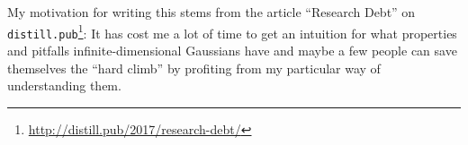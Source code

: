 \documentclass{scrartcl}
\theoremstyle{definition}
\theoremstyle{remark}
\begin{document}
My motivation for writing this stems from the article ``Research Debt'' on \texttt{distill.pub}\footnote{\url{http://distill.pub/2017/research-debt/}}: It has cost me a lot of time to get an intuition for what properties and pitfalls infinite-dimensional Gaussians have and maybe a few people can save themselves the ``hard climb'' by profiting from my particular way of understanding them.


\end{document}
